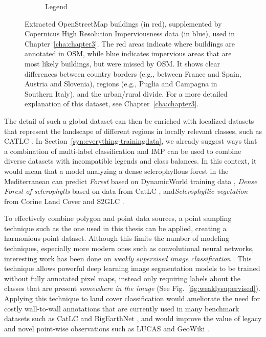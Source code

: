 \begin{figure}[H]
\begin{subfigure}{0.48\textwidth}
                    \caption{Legend}
                    \label{fig:osm_vs_cop_legend} %
                \end{subfigure}
                
                \caption{Extracted OpenStreetMap buildings (in red), supplemented by Copernicus High Resolution Imperviousness data (in blue), used in Chapter\@~\ref{cha:chapter3}. The red areas indicate where buildings are annotated in OSM, while blue indicates impervious areas that are most likely buildings, but were missed by OSM. It shows clear differences between country borders (e.g., between France and Spain, Austria and Slovenia), regions (e.g., Puglia and Campagna in Southern Italy), and the urban/rural divide. For a more detailed explanation of this dataset, see Chapter\@~\ref{cha:chapter3}.}
                \label{fig:osm_vs_cop_overall} %
            \end{figure}

            
            The detail of such a global dataset can then be enriched with localized datasets that represent the landscape of different regions in locally relevant classes, such as CATLC \citep{garcia2022catlc}. In Section\@~\ref{syn:everything-trainingdata}, we already suggest ways that a combination of multi-label classification and IMP can be used to combine diverse datasets with incompatible legends and class balances. In this context, it would mean that a model analyzing a dense sclerophyllous forest in the Mediterranean can predict \textit{Forest} based on DynamicWorld training data \citep{tait2021dwtd}, \textit{Dense Forest of sclerophylls} based on data from CatLC \citep{garcia2022catlc}, and\textit{Sclerophyllic vegetation} from Corine Land Cover and S2GLC \citep{jenerowicz2021validation}. 

            To effectively combine polygon and point data sources, a point sampling technique such as the one used in this thesis can be applied, creating a harmonious point dataset. Although this limits the number of modeling techniques, especially more modern ones such as convolutional neural networks, interesting work has been done on \textit{weakly supervised image classification} \citep{huang2018weaklysupervised}. This technique allows powerful deep learning image segmentation models to be trained without fully annotated pixel maps, instead only requiring labels about the classes that are present \textit{somewhere in the image} (See Fig.\@~\ref{fig:weaklysupervised}). Applying this technique to land cover classification would ameliorate the need for costly wall-to-wall annotations that are currently used in many benchmark datasets such as CatLC \citep{garcia2022catlc} and BigEarthNet \citep{sumbul2021bigearthnet}, and would improve the value of legacy and novel point-wise observations such as LUCAS \citep{dandrimont2021lucas} and GeoWiki \citep{fritz2012geo}.

